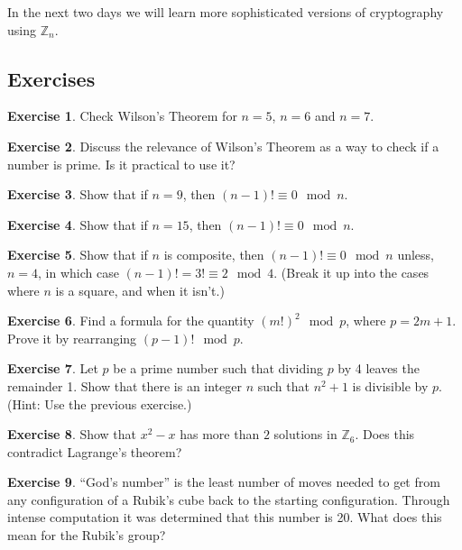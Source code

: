 \documentclass[11pt]{article}
\theoremstyle{definition}
\newtheorem{exercise}{Exercise}
\numberwithin{thm}{section}
\begin{document}
In the next two days we will learn more sophisticated versions of cryptography using $\mathbb{Z}_n$.

\subsection{Exercises}

\begin{exercise} Check Wilson's Theorem for $n=5$, $n=6$ and $n=7$.
\end{exercise}

\begin{exercise} Discuss the relevance of Wilson's Theorem as a way to check if a number is prime. Is it practical to use it?
\end{exercise}

\begin{exercise} Show that if $n=9$, then $(n-1)! \equiv 0 \mod n$.
\end{exercise}

\begin{exercise} Show that if $n=15$, then $(n-1)! \equiv 0 \mod n$.
\end{exercise}

\begin{exercise} Show that if $n$ is composite, then $(n-1)! \equiv 0 \mod n$ unless, $n=4$, in which case $(n-1)! = 3! \equiv 2 \mod 4$. (Break it up into the cases where $n$ is a square, and when it isn't.)
\end{exercise}

\begin{exercise} Find a formula for the quantity $(m!)^{2} \mod p$, where $p=2m+1$. Prove it by rearranging $(p-1)! \mod p$.
\end{exercise}

\begin{exercise} Let ${p}$ be a prime number such that dividing ${p}$ by 4 leaves the remainder 1. Show that there is an integer ${n}$ such that $n^2 + 1$ is divisible by ${p}$. (Hint: Use the previous exercise.)
\end{exercise}

\begin{exercise} Show that $x^2 - x$ has more than $2$ solutions in $\mathbb{Z}_6$. Does this contradict Lagrange's theorem?
\end{exercise}

\begin{exercise} ``God's number'' is the least number of moves needed to get from any configuration of a Rubik's cube back to the starting configuration. Through intense computation it was determined that this number is 20. What does this mean for the Rubik's group?
\end{exercise}
\end{document}
